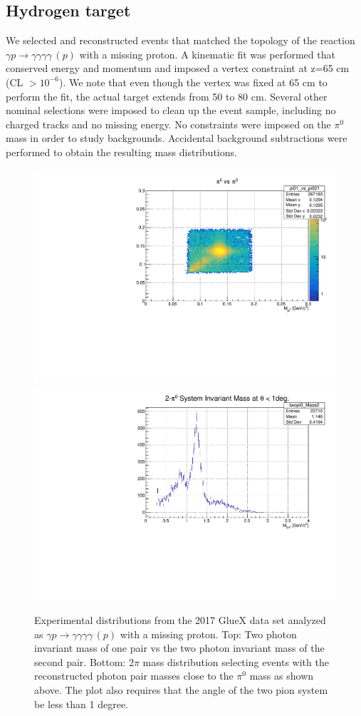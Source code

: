 \subsection{Hydrogen target}
  We selected and reconstructed events that matched the
topology of the reaction $\gamma p\rightarrow \gamma \gamma \gamma
\gamma\, (p)$ with a missing proton. A kinematic fit was performed
that conserved energy and momentum and imposed a vertex constraint at
z=65 cm (CL $> 10^{-6}$). We note that even though the vertex was
fixed at 65 cm to perform the fit, the actual target extends from 50
to 80 cm. Several other nominal selections were imposed to clean up
the event sample, including no charged tracks and no missing
energy. No constraints were imposed on the $\pi^0$ mass in order to
study backgrounds. Accidental background subtractions were performed
to obtain the resulting mass distributions.
\begin{figure}[tph] 
\centering
\includegraphics[width=4.75in]{figures/pi0VSpi0.pdf} \\
\centering
\includegraphics[width=4.75in]{figures/TwoPiInvMass.pdf}
\caption{Experimental distributions from the 2017 GlueX data set analyzed as $\gamma p\rightarrow \gamma \gamma \gamma \gamma\, (p)$ with a missing proton. Top: Two photon invariant mass of one pair vs the two photon invariant mass of the second pair. Bottom: 2$\pi$ mass distribution selecting events with the reconstructed photon pair masses close to the $\pi^0$ mass as  shown above. The plot also requires that the angle of the two pion system be less than 1 degree.
\label{fig:TwoPiInvMass}}
\end{figure}

